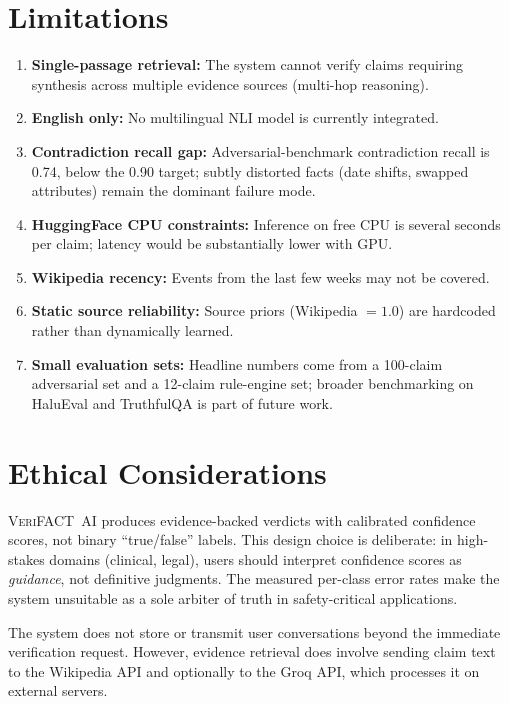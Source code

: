 \documentclass[12pt, a4paper, oneside]{report}
\newcommand{\verifact}{\textsc{VeriFACT~AI}}
\begin{document}
\section{Limitations}

\begin{enumerate}[nosep]
    \item \textbf{Single-passage retrieval:} The system cannot verify claims requiring synthesis across multiple evidence sources (multi-hop reasoning).
    \item \textbf{English only:} No multilingual NLI model is currently integrated.
    \item \textbf{Contradiction recall gap:} Adversarial-benchmark contradiction recall is 0.74, below the 0.90 target; subtly distorted facts (date shifts, swapped attributes) remain the dominant failure mode.
    \item \textbf{HuggingFace CPU constraints:} Inference on free CPU is several seconds per claim; latency would be substantially lower with GPU.
    \item \textbf{Wikipedia recency:} Events from the last few weeks may not be covered.
    \item \textbf{Static source reliability:} Source priors (Wikipedia $= 1.0$) are hardcoded rather than dynamically learned.
    \item \textbf{Small evaluation sets:} Headline numbers come from a 100-claim adversarial set and a 12-claim rule-engine set; broader benchmarking on HaluEval and TruthfulQA is part of future work.
\end{enumerate}

\section{Ethical Considerations}

\verifact{} produces evidence-backed verdicts with calibrated confidence scores, not binary ``true/false'' labels. This design choice is deliberate: in high-stakes domains (clinical, legal), users should interpret confidence scores as \emph{guidance}, not definitive judgments. The measured per-class error rates make the system unsuitable as a sole arbiter of truth in safety-critical applications.

The system does not store or transmit user conversations beyond the immediate verification request. However, evidence retrieval does involve sending claim text to the Wikipedia API and optionally to the Groq API, which processes it on external servers.
\end{document}
